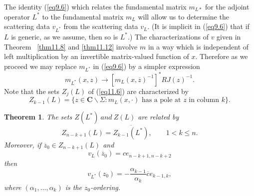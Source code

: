 \documentclass{surv-l}
\theoremstyle{plain}
\newtheorem{theorem}{Theorem}[section]
\theoremstyle{definition}
\numberwithin{equation}{chapter}
\begin{document}
The identity (\ref{eq9.6}) which relates the fundamental matrix $m_{L*}$ for the adjoint operator $L^{*}$ to the fundamental matrix $m_{L}$ will allow us to determine the scattering data $v_{L^{*}}$ from the scattering data $v_{L}$. (It is implicit in (\ref{eq9.6}) that if $L$ is generic, as we assume, then so is $L^{*}.$) The characterizations of $v$ given in Theorem ~\ref{thm11.8} and \ref{thm11.12} involve $m$ in a way which is independent of left multiplication by an invertible matrix-valued function of $x$. Therefore as we proceed we may replace $m_{L^{*}}$ in (\ref{eq9.6}) by a simpler expression
\setcounter{equation}{0}
\begin{equation}\label{eq15.1}
m_{L^{*}}(x, z)\rightarrow[m_{L}(x,\overline{z})^{-1}]^{*}RJ(z)^{-1}.
\end{equation}
Note that the sets $Z_{j}(L)$ of (\ref{eq11.6}) are characterized by
\begin{equation}\label{eq15.2}
Z_{k-1}(L)=\{z\in \mathbf{C}\backslash \Sigma : m_{L}(x,\cdot) \text{ has a pole at } z\text{ in column } k\}.
\end{equation}
\setcounter{theorem}{2}
\begin{theorem}\label{thm15.3}
The sets $Z(L^{*})\ and \ Z(L)$  are related by
\setcounter{equation}{3}
\begin{equation}\label{eq15.4}
Z_{n-k+1}(L)=\overline{Z_{k-1}(L^{*})},\qquad 1<k\leq n.
\end{equation}
Moreover, if $\overline{z}_{0}\in Z_{n-k+1}(L)$ and
\begin{equation}\label{eq15.5}
v_{L}(\overline{z}_{0})=ce_{n-k+1,n-k+2}
\end{equation}
then
\begin{equation}\label{eq15.6}
v_{L^{*}}(z_{0})=-\frac{\alpha_{k-1}}{\alpha_{k}}\overline{c}e_{k-1,k},
\end{equation}
where $(\alpha_{1},\ldots,\alpha_{k})$ is the $z_{0}$-ordering.
\end{theorem}
\end{document}
